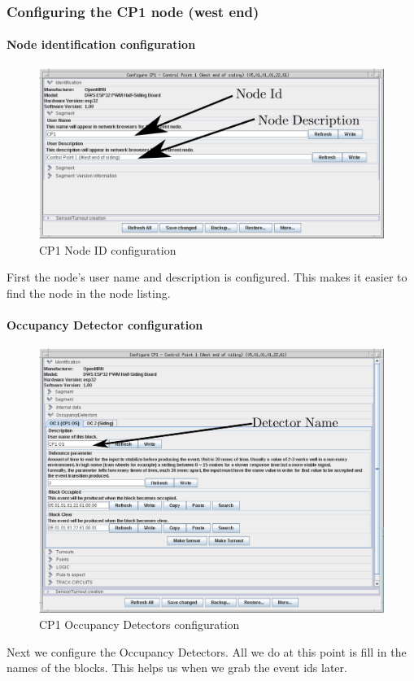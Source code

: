 \subsubsection{Configuring the CP1 node (west end)}

\paragraph{Node identification configuration}
\begin{figure}[hbpt]\begin{centering}%
\includegraphics[width=5in]{CP1-ID-Config-Annotated.png}
\caption{CP1 Node ID configuration}
\label{fig:CP1-ID-Config}
\end{centering}\end{figure}
First the node's user name and description is configured.  This makes it easier 
to find the node in the node listing.

\clearpage
\paragraph{Occupancy Detector configuration}
\begin{figure}[hbpt]\begin{centering}%
\includegraphics[width=5in]{CP1-OC-Config-Annotated.png}
\caption{CP1 Occupancy Detectors configuration}
\label{fig:CP1-OC-Config}
\end{centering}\end{figure}
Next we configure the Occupancy Detectors.  All we do at this point is fill in 
the names of the blocks.  This helps us when we grab the event ids later.
 
